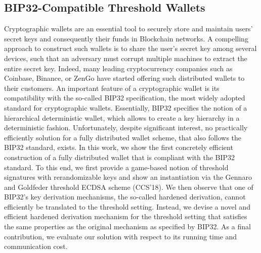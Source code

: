 \documentclass[11pt]{article}
\theoremstyle{definition}
\theoremstyle{remark}
\theoremstyle{plain}
\begin{document}
\subsection{\cite{10.1145/3708821.3710830} BIP32-Compatible Threshold Wallets}
Cryptographic wallets are an essential tool to securely store and maintain users’ secret keys and consequently their funds in Blockchain networks. A compelling approach to construct such wallets is to share the user’s secret key among several devices, such that an adversary must corrupt multiple machines to extract the entire secret key. Indeed, many leading cryptocurrency companies such as Coinbase, Binance, or ZenGo have started offering such distributed wallets to their customers. An important feature of a cryptographic wallet is its compatibility with the so-called BIP32 specification, the most widely adopted standard for cryptographic wallets. Essentially, BIP32 specifies the notion of a hierarchical deterministic wallet, which allows to create a key hierarchy in a deterministic fashion. Unfortunately, despite significant interest, no practically efficiently solution for a fully distributed wallet scheme, that also follows the BIP32 standard, exists. In this work, we show the first concretely efficient construction of a fully distributed wallet that is compliant with the BIP32 standard. To this end, we first provide a game-based notion of threshold signatures with rerandomizable keys and show an instantiation via the Gennaro and Goldfeder threshold ECDSA scheme (CCS’18). We then observe that one of BIP32’s key derivation mechanisms, the so-called hardened derivation, cannot efficiently be translated to the threshold setting. Instead, we devise a novel and efficient hardened derivation mechanism for the threshold setting that satisfies the same properties as the original mechanism as specified by BIP32. As a final contribution, we evaluate our solution with respect to its running time and communication cost.
\end{document}
